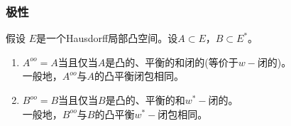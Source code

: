 \begin{example}[缓增广义函数]
	
\end{example}

\subsubsection{极性}

\begin{theorem}[双极定理]
	假设 $E$是一个Hausdorff局部凸空间。设$A\subset E $，$B \subset E^{*} $。
	\begin{enumerate}
		\item $ A^{oo} = A $当且仅当$ A $是凸的、平衡的和闭的(等价于$w-$闭的)。
		\\一般地，$A^{oo}$与$A$的凸平衡闭包相同。
		\item $B^{oo} = B $当且仅当$B$是凸的、平衡的和$w^{*}-$闭的。\\
		一般地，$B^{oo}$与$B$的凸平衡$w^{*}-$闭包相同。
	\end{enumerate}
\end{theorem}














